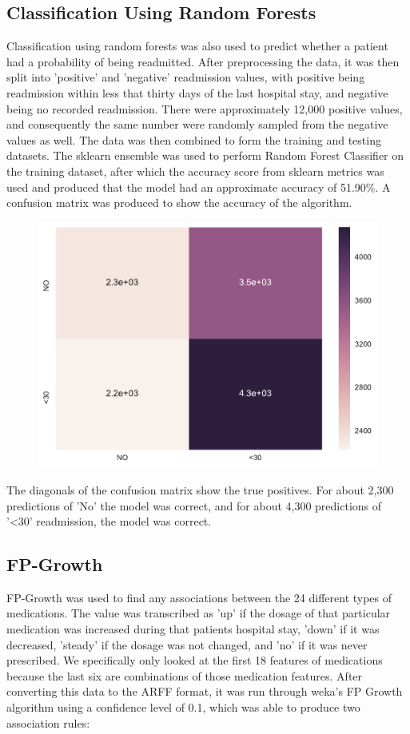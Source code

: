 \documentclass{neu_handout}
\begin{document}
\subsection*{Classification Using Random Forests}
Classification using random forests was also used to predict whether a patient had a probability of being readmitted. After preprocessing the data, it was then split into 'positive' and 'negative' readmission values, with positive being readmission within less that thirty days of the last hospital stay, and negative being no recorded readmission. There were approximately 12,000 positive values, and consequently the same number were randomly sampled from the negative values as well. The data was then combined to form the training and testing datasets. The sklearn ensemble was used to perform Random Forest Classifier on the training dataset, after which the accuracy score from sklearn metrics was used and produced that the model had an approximate accuracy of 51.90\%. A confusion matrix was produced to show the accuracy of the algorithm. 

\begin{figure}[H]
\centering
\includegraphics[width=0.47\linewidth]{random_forest_confusion_matrix}
\end{figure}

The diagonals of the confusion matrix show the true positives. For about 2,300 predictions of 'No' the model was correct, and for about 4,300 predictions of '<30' readmission, the model was correct. 

\subsection*{FP-Growth}
FP-Growth was used to find any associations between the 24 different types of medications. The value was transcribed as 'up' if the dosage of that particular medication was increased during that patients hospital stay, 'down' if it was decreased, 'steady' if the dosage was not changed, and 'no' if it was never prescribed. We specifically only looked at the first 18 features of medications because the last six are combinations of those medication features. After converting this data to the ARFF format, it was run through weka's FP Growth algorithm using a confidence level of 0.1, which was able to produce two association rules:\\
\end{document}
